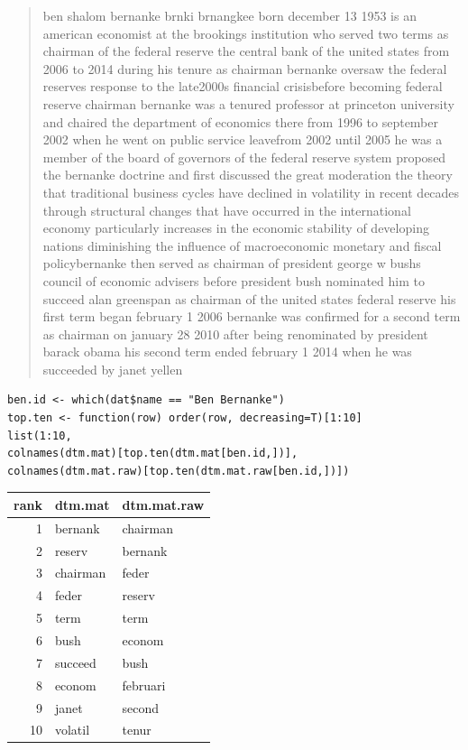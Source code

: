 \documentclass[11pt]{article}
\begin{document}
\begin{quote}
ben shalom bernanke brnki brnangkee born december 13 1953 is an american economist at the brookings institution who served two terms as chairman of the federal reserve the central bank of the united states from 2006 to 2014 during his tenure as chairman bernanke oversaw the federal reserves response to the late2000s financial crisisbefore becoming federal reserve chairman bernanke was a tenured professor at princeton university and chaired the department of economics there from 1996 to september 2002 when he went on public service leavefrom 2002 until 2005 he was a member of the board of governors of the federal reserve system proposed the bernanke doctrine and first discussed the great moderation the theory that traditional business cycles have declined in volatility in recent decades through structural changes that have occurred in the international economy particularly increases in the economic stability of developing nations diminishing the influence of macroeconomic monetary and fiscal policybernanke then served as chairman of president george w bushs council of economic advisers before president bush nominated him to succeed alan greenspan as chairman of the united states federal reserve his first term began february 1 2006 bernanke was confirmed for a second term as chairman on january 28 2010 after being renominated by president barack obama his second term ended february 1 2014 when he was succeeded by janet yellen
\end{quote}



\begin{verbatim}
ben.id <- which(dat$name == "Ben Bernanke")
top.ten <- function(row) order(row, decreasing=T)[1:10]
list(1:10,
colnames(dtm.mat)[top.ten(dtm.mat[ben.id,])],
colnames(dtm.mat.raw)[top.ten(dtm.mat.raw[ben.id,])])
\end{verbatim}

\begin{org}
\begin{center}
\begin{tabular}{rll}
rank & dtm.mat & dtm.mat.raw\\
\hline
1 & bernank & chairman\\
2 & reserv & bernank\\
3 & chairman & feder\\
4 & feder & reserv\\
5 & term & term\\
6 & bush & econom\\
7 & succeed & bush\\
8 & econom & februari\\
9 & janet & second\\
10 & volatil & tenur\\
\end{tabular}
\end{center}
\end{org}
\end{document}
